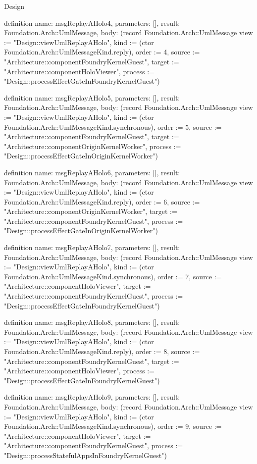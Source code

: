 \begin{lexlean}{Design}
\begin{semanticmodule}
definition{
  name: msgReplayAHolo4,
  parameters: [],
  result: Foundation.Arch::UmlMessage,
  body: (record Foundation.Arch::UmlMessage {view := "Design::viewUmlReplayAHolo", kind := (ctor Foundation.Arch::UmlMessageKind.reply), order := 4, source := "Architecture::componentFoundryKernelGuest", target := "Architecture::componentHoloViewer", process := "Design::processEffectGateInFoundryKernelGuest"})
}

definition{
  name: msgReplayAHolo5,
  parameters: [],
  result: Foundation.Arch::UmlMessage,
  body: (record Foundation.Arch::UmlMessage {view := "Design::viewUmlReplayAHolo", kind := (ctor Foundation.Arch::UmlMessageKind.synchronous), order := 5, source := "Architecture::componentFoundryKernelGuest", target := "Architecture::componentOriginKernelWorker", process := "Design::processEffectGateInOriginKernelWorker"})
}

definition{
  name: msgReplayAHolo6,
  parameters: [],
  result: Foundation.Arch::UmlMessage,
  body: (record Foundation.Arch::UmlMessage {view := "Design::viewUmlReplayAHolo", kind := (ctor Foundation.Arch::UmlMessageKind.reply), order := 6, source := "Architecture::componentOriginKernelWorker", target := "Architecture::componentFoundryKernelGuest", process := "Design::processEffectGateInOriginKernelWorker"})
}

definition{
  name: msgReplayAHolo7,
  parameters: [],
  result: Foundation.Arch::UmlMessage,
  body: (record Foundation.Arch::UmlMessage {view := "Design::viewUmlReplayAHolo", kind := (ctor Foundation.Arch::UmlMessageKind.synchronous), order := 7, source := "Architecture::componentHoloViewer", target := "Architecture::componentFoundryKernelGuest", process := "Design::processEffectGateInFoundryKernelGuest"})
}

definition{
  name: msgReplayAHolo8,
  parameters: [],
  result: Foundation.Arch::UmlMessage,
  body: (record Foundation.Arch::UmlMessage {view := "Design::viewUmlReplayAHolo", kind := (ctor Foundation.Arch::UmlMessageKind.reply), order := 8, source := "Architecture::componentFoundryKernelGuest", target := "Architecture::componentHoloViewer", process := "Design::processEffectGateInFoundryKernelGuest"})
}

definition{
  name: msgReplayAHolo9,
  parameters: [],
  result: Foundation.Arch::UmlMessage,
  body: (record Foundation.Arch::UmlMessage {view := "Design::viewUmlReplayAHolo", kind := (ctor Foundation.Arch::UmlMessageKind.synchronous), order := 9, source := "Architecture::componentHoloViewer", target := "Architecture::componentFoundryKernelGuest", process := "Design::processStatefulAppsInFoundryKernelGuest"})
}


\end{semanticmodule}
\end{lexlean}

